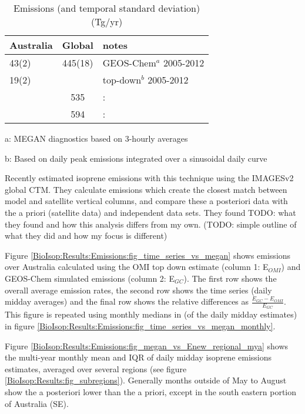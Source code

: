     \begin{table}\begin{threeparttable}
      \caption{Emissions (and temporal standard deviation) (Tg/yr)}
      \begin{tabular}{ l  c  l } 
        \toprule
        Australia & Global & notes \\
        \midrule
        43(2) & 445(18) & GEOS-Chem$^a$ 2005-2012 \\
        19(2) &  & top-down$^b$ 2005-2012 \\
         &  535 & \parencite{Guenther2012}: \\
         &  594 & \parencite{Sindelarova2014}: \\
        \bottomrule
      \end{tabular}
      \begin{tablenotes} 
        \item a: MEGAN diagnostics based on 3-hourly averages
        \item b: Based on daily peak emissions integrated over a sinusoidal daily curve
      \end{tablenotes}
      \label{BioIsop:Results:Emissions:tab_emissions_Tg}
    \end{threeparttable}\end{table}
    
    Recently \textcite{Bauwens2016} estimated isoprene emissions with this technique using the IMAGESv2 global CTM.
    They calculate emissions which create the closest match between model and satellite vertical columns, and compare these a posteriori data with the a priori (satellite data) and independent data sets.
    They found TODO: what they found and how this analysis differs from my own.
    (TODO: simple outline of what they did and how my focus is different)
    
    Figure \ref{BioIsop:Results:Emissions:fig_time_series_vs_megan} shows emissions over Australia calculated using the OMI top down estimate (column 1: E$_{OMI}$) and GEOS-Chem simulated emissions (column 2: E$_{GC}$).
    The first row shows the overall average emission rates, the second row shows the time series (daily midday averages) and the final row shows the relative differences as $\frac{E_{GC} - E_{OMI}}{E_{GC}}$.
    This figure is repeated using monthly medians in (of the daily midday estimates) in figure \ref{BioIsop:Results:Emissions:fig_time_series_vs_megan_monthly}.
    
    Figure \ref{BioIsop:Results:Emissions:fig_megan_vs_Enew_regional_mya} shows the multi-year monthly mean and IQR of daily midday isoprene emissions estimates, averaged over several regions (see figure \ref{BioIsop:Results:fig_subregions}). 
    Generally months outside of May to August show the a posteriori lower than the a priori, except in the south eastern portion of Australia (SE).
    
